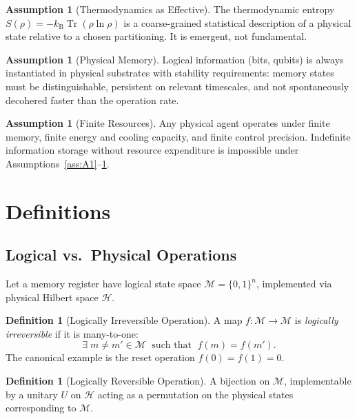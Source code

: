 \documentclass[12pt,letterpaper]{article}
\theoremstyle{plain}
\theoremstyle{definition}
\newtheorem{definition}[theorem]{Definition}
\newtheorem{assumption}[theorem]{Assumption}
\theoremstyle{remark}
\newcommand{\tr}{\operatorname{Tr}}
\newcommand{\kB}{k_{\mathrm{B}}}
\begin{document}
\begin{assumption}[Thermodynamics as Effective]\label{ass:A3}
The thermodynamic entropy $S(\rho) = -\kB\tr(\rho\ln\rho)$ is a coarse-grained statistical
description of a physical state relative to a chosen partitioning.  It is emergent, not
fundamental.
\end{assumption}

\begin{assumption}[Physical Memory]\label{ass:A4}
Logical information (bits, qubits) is always instantiated in physical substrates with stability
requirements: memory states must be distinguishable, persistent on relevant timescales, and not
spontaneously decohered faster than the operation rate.
\end{assumption}

\begin{assumption}[Finite Resources]\label{ass:A5}
Any physical agent operates under finite memory, finite energy and cooling capacity, and finite
control precision.  Indefinite information storage without resource expenditure is impossible
under Assumptions~\ref{ass:A1}--\ref{ass:A4}.
\end{assumption}

\section{Definitions}
\label{sec:definitions}

\subsection{Logical vs.\ Physical Operations}

Let a memory register have logical state space $\mathcal{M} = \{0,1\}^{n}$, implemented via
physical Hilbert space $\mathcal{H}$.

\begin{definition}[Logically Irreversible Operation]
A map $f\colon\mathcal{M}\to\mathcal{M}$ is \emph{logically irreversible} if it is
many-to-one:
\begin{equation}
  \exists\; m \neq m' \in \mathcal{M} \;\text{ such that }\; f(m) = f(m').
  \label{eq:irreversible}
\end{equation}
The canonical example is the reset operation $f(0) = f(1) = 0$.
\end{definition}

\begin{definition}[Logically Reversible Operation]
A bijection on $\mathcal{M}$, implementable by a unitary $U$ on $\mathcal{H}$ acting as a
permutation on the physical states corresponding to $\mathcal{M}$.
\end{definition}
\end{document}
